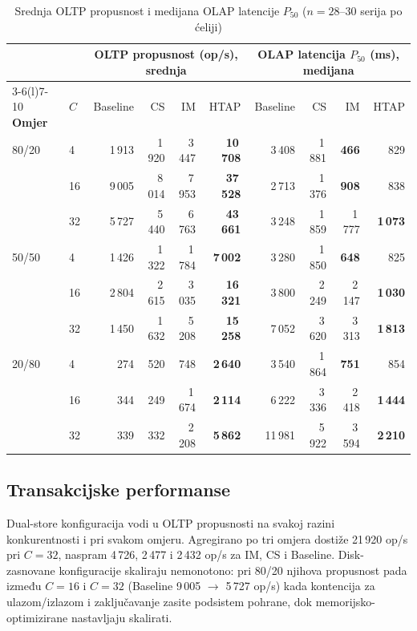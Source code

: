 \documentclass[10pt,conference,a4paper]{IEEEtran}
\newcommand{\best}[1]{\textbf{#1}}
\begin{document}
\begin{table}[t]
\caption{Srednja OLTP propusnost i medijana OLAP latencije $P_{50}$ ($n = 28$--$30$ serija po ćeliji)}
\label{tab:main}
\centering
\footnotesize
\begin{tabular}{@{}ll rrrr rrrr@{}}
\toprule
& & \multicolumn{4}{c}{\textbf{OLTP propusnost (op/s), srednja}} & \multicolumn{4}{c}{\textbf{OLAP latencija $P_{50}$ (ms), medijana}}\\
\cmidrule(lr){3-6}\cmidrule(l){7-10}
\textbf{Omjer} & \textbf{$C$} & Baseline & CS & IM & HTAP & Baseline & CS & IM & HTAP\\
\midrule
80/20 & 4  & 1\,913 & 1\,920 & 3\,447 & \best{10\,708} & 3\,408 & 1\,881 & \best{466} & 829\\
      & 16 & 9\,005 & 8\,014 & 7\,953 & \best{37\,528} & 2\,713 & 1\,376 & \best{908} & 838\\
      & 32 & 5\,727 & 5\,440 & 6\,763 & \best{43\,661} & 3\,248 & 1\,859 & 1\,777 & \best{1\,073}\\
50/50 & 4  & 1\,426 & 1\,322 & 1\,784 & \best{7\,002}  & 3\,280 & 1\,850 & \best{648} & 825\\
      & 16 & 2\,804 & 2\,615 & 3\,035 & \best{16\,321} & 3\,800 & 2\,249 & 2\,147 & \best{1\,030}\\
      & 32 & 1\,450 & 1\,632 & 5\,208 & \best{15\,258} & 7\,052 & 3\,620 & 3\,313 & \best{1\,813}\\
20/80 & 4  & 274  & 520  & 748   & \best{2\,640}  & 3\,540 & 1\,864 & \best{751} & 854\\
      & 16 & 344  & 249  & 1\,674 & \best{2\,114} & 6\,222 & 3\,336 & 2\,418 & \best{1\,444}\\
      & 32 & 339  & 332  & 2\,208 & \best{5\,862} & 11\,981 & 5\,922 & 3\,594 & \best{2\,210}\\
\bottomrule
\end{tabular}
\end{table}

\subsection{Transakcijske performanse}
Dual-store konfiguracija vodi u OLTP propusnosti na svakoj razini
konkurentnosti i pri svakom omjeru. Agregirano po tri omjera dostiže 21\,920
op/s pri $C = 32$, naspram 4\,726, 2\,477 i 2\,432 op/s za IM, CS i Baseline.
Disk-zasnovane konfiguracije skaliraju nemonotono: pri 80/20 njihova
propusnost pada između $C = 16$ i $C = 32$ (Baseline 9\,005 $\rightarrow$
5\,727 op/s) kada kontencija za ulazom/izlazom i zaključavanje zasite
podsistem pohrane, dok memorijsko-optimizirane nastavljaju skalirati.
\end{document}
